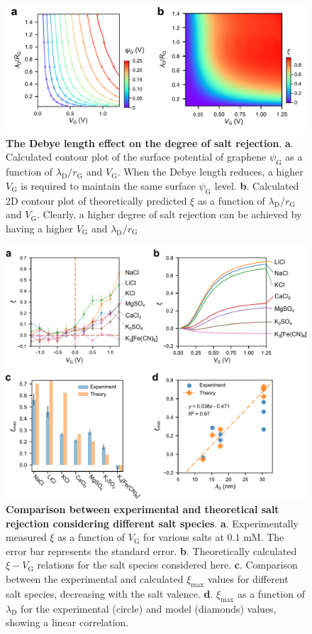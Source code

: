 \documentclass[journal=nalefd,email=true, hyperref=true, keywords=false]{achemso}
\begin{document}
\begin{figure}[H]
  \centering
  \includegraphics[width=0.95\linewidth]{img/fig5.pdf}
  \caption{\textbf{The Debye length effect on the degree of salt
      rejection}. \textbf{a}. Calculated contour plot of the surface
    potential of graphene $\psi_{\mathrm{G}}$ as a function of
    $\lambda_{\mathrm{D}}/r_{\mathrm{G}}$ and $V_{\mathrm{G}}$. When
    the Debye length reduces, a higher $V_{\mathrm{G}}$ is required to
    maintain the same surface $\psi_{\mathrm{G}}$
    level. \textbf{b}. Calculated 2D contour plot of theoretically
    predicted $\xi$ as a function of
    $\lambda_{\mathrm{D}}/r_{\mathrm{G}}$ and
    $V_{\mathrm{G}}$. Clearly, a higher degree of salt rejection can
    be achieved by having a higher $V_{\mathrm{G}}$ and
    $\lambda_{\mathrm{D}}/r_{\mathrm{G}}$}
  \label{fig:5}
\end{figure}

\begin{figure}[H]
  \centering
  \includegraphics[width=0.95\linewidth]{img/fig6.pdf}
  \caption{\textbf{Comparison between experimental and theoretical
      salt rejection considering different salt
      species}. \textbf{a}. Experimentally measured $\xi$ as a
    function of $V_{\mathrm{G}}$ for various salts at 0.1 mM. The
    error bar represents the standard error. \textbf{b}. Theoretically
    calculated $\xi-V_{\mathrm{G}}$ relations for the salt species
    considered here. \textbf{c}. Comparison between the experimental
    and calculated $\xi_{\mathrm{max}}$ values for different salt
    species, decreasing with the salt
    valence. \textbf{d}. $\xi_{\mathrm{max}}$ as a function of
    $\lambda_{\mathrm{D}}$ for the experimental (circle) and model
    (diamonds) values, showing a linear correlation.}
  \label{fig:6}
\end{figure}
\end{document}
